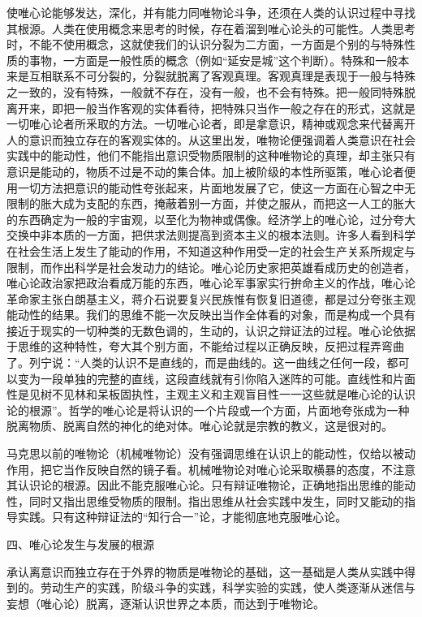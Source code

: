 使唯心论能够发达，深化，并有能力同唯物论斗争，还须在人类的认识过程中寻找其根源。人类在使用概念来思考的时候，存在着溜到唯心论头的可能性。人类思考时，不能不使用概念，这就使我们的认识分裂为二方面，一方面是个别的与特殊性质的事物，一方面是一般性质的概念（例如“延安是城”这个判断）。特殊和一般本来是互相联系不可分裂的，分裂就脱离了客观真理。客观真理是表现于一般与特殊之一致的，没有特殊，一般就不存在，没有一般，也不会有特殊。把一般同特殊脱离开来，即把一般当作客观的实体看待，把特殊只当作一般之存在的形式，这就是一切唯心论者所釆取的方法。一切唯心论者，即是拿意识，精神或观念来代替离开人的意识而独立存在的客观实体的。从这里出发，唯物论便强调着人类意识在社会实践中的能动性，他们不能指出意识受物质限制的这种唯物论的真理，却主张只有意识是能动的，物质不过是不动的集合体。加上被阶级的本性所驱策，唯心论者便用一切方法把意识的能动性夸张起来，片面地发展了它，使这一方面在心智之中无限制的胀大成为支配的东西，掩蔽着别一方面，并使之服从，而把这一人工的胀大的东西确定为一般的宇宙观，以至化为物神或偶像。经济学上的唯心论，过分夸大交换中非本质的一方面，把供求法则提高到资本主义的根本法则。许多人看到科学在社会生活上发生了能动的作用，不知道这种作用受一定的社会生产关系所规定与限制，而作出科学是社会发动力的结论。唯心论历史家把英雄看成历史的创造者，唯心论政治家把政治看成万能的东西，唯心论军事家实行拚命主义的作战，唯心论革命家主张白朗基主义，蒋介石说要复兴民族惟有恢复旧道德，都是过分夸张主观能动性的结果。我们的思维不能一次反映出当作全体看的对象，而是构成一个具有接近于现实的一切种类的无数色调的，生动的，认识之辩证法的过程。唯心论依据于思维的这种特性，夸大其个别方面，不能给过程以正确反映，反把过程弄弯曲了。列宁说：“人类的认识不是直线的，而是曲线的。这一曲线之任何一段，都可以变为一段单独的完整的直线，这段直线就有引你陷入迷阵的可能。直线性和片面性是见树不见林和呆板固执性，主观主义和主观盲目性一一这些就是唯心论的认识论的根源”。哲学的唯心论是将认识的一个片段或一个方面，片面地夸张成为一种脱离物质、脱离自然的神化的绝对体。唯心论就是宗教的教义，这是很对的。

马克思以前的唯物论（机械唯物论）没有强调思维在认识上的能动性，仅给以被动作用，把它当作反映自然的镜子看。机械唯物论对唯心论采取横暴的态度，不注意其认识论的根源。因此不能克服唯心论。只有辩证唯物论，正确地指出思维的能动性，同时又指出思维受物质的限制。指出思维从社会实践中发生，同时又能动的指导实践。只有这种辩证法的“知行合一”论，才能彻底地克服唯心论。

四、唯心论发生与发展的根源

承认离意识而独立存在于外界的物质是唯物论的基础，这一基础是人类从实践中得到的。劳动生产的实践，阶级斗争的实践，科学实验的实践，使人类逐渐从迷信与妄想（唯心论）脱离，逐渐认识世界之本质，而达到于唯物论。

